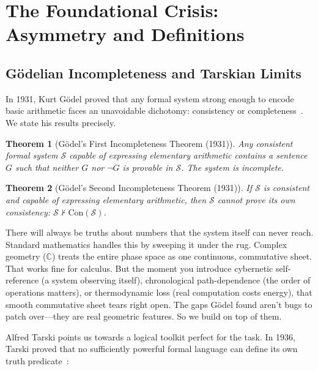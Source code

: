 \documentclass[12pt,oneside]{article}
\theoremstyle{principia}
\newtheorem{theorem}{Theorem}[section]
\theoremstyle{definition}
\theoremstyle{remark}
\providecommand{\CC}{\mathbb{C}}
\begin{document}
\newpage

\newpage


\section{The Foundational Crisis: Asymmetry and Definitions}

\subsection{G\"odelian Incompleteness and Tarskian Limits}

In 1931, Kurt G\"odel proved that any formal system strong enough to encode basic arithmetic faces an unavoidable dichotomy: consistency or completeness~\cite{godel}. We state his results precisely.

\begin{theorem}[G\"odel's First Incompleteness Theorem (1931)]\label{thm:godel1}
Any consistent formal system $\mathcal{S}$ capable of expressing elementary arithmetic contains a sentence $G$ such that neither $G$ nor $\neg G$ is provable in $\mathcal{S}$. The system is incomplete.
\end{theorem}

\begin{theorem}[G\"odel's Second Incompleteness Theorem (1931)]\label{thm:godel2}
If $\mathcal{S}$ is consistent and capable of expressing elementary arithmetic, then $\mathcal{S}$ cannot prove its own consistency: $\mathcal{S} \nvdash \mathrm{Con}(\mathcal{S})$.
\end{theorem}

There will always be truths about numbers that the system itself can never reach. Standard mathematics handles this by sweeping it under the rug. Complex geometry ($\CC$) treats the entire phase space as one continuous, commutative sheet. That works fine for calculus. But the moment you introduce cybernetic self-reference (a system observing itself), chronological path-dependence (the order of operations matters), or thermodynamic loss (real computation costs energy), that smooth commutative sheet tears right open. The gaps G\"odel found aren't bugs to patch over---they are real geometric features. So we build on top of them.

Alfred Tarski points us towards a logical toolkit perfect for the task. In 1936, Tarski proved that no sufficiently powerful formal language can define its own truth predicate~\cite{tarski}:
\end{document}
